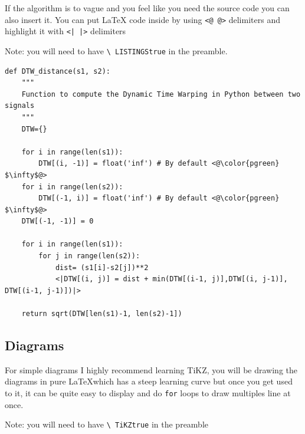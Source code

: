 \documentclass[11pt,letterpaper]{article}
\begin{document}
\begin{tip}
If the algorithm is to vague and you feel like you need the source code you can also insert it. You can put LaTeX code inside by using \texttt{<@ @>} delimiters and highlight it with \texttt{<| |>} delimiters

Note: you will need to have \texttt{\textbackslash
LISTINGStrue} in the preamble.
\end{tip}

\begin{lstlisting}[style=Python]
def DTW_distance(s1, s2):
    """
    Function to compute the Dynamic Time Warping in Python between two signals
    """
    DTW={}

    for i in range(len(s1)):
        DTW[(i, -1)] = float('inf') # By default <@\color{pgreen} $\infty$@>
    for i in range(len(s2)):
        DTW[(-1, i)] = float('inf') # By default <@\color{pgreen} $\infty$@>
    DTW[(-1, -1)] = 0

    for i in range(len(s1)):
        for j in range(len(s2)):
            dist= (s1[i]-s2[j])**2
            <|DTW[(i, j)] = dist + min(DTW[(i-1, j)],DTW[(i, j-1)], DTW[(i-1, j-1)])|>

    return sqrt(DTW[len(s1)-1, len(s2)-1])
\end{lstlisting}

\clearpage
\subsection{Diagrams} %
\label{sub:diagrams}

\begin{tip}
For simple diagrams I highly recommend learning TiKZ, you will be drawing the diagrams in pure \LaTeX which has a steep learning curve but once you get used to it, it can be quite easy to display and do \texttt{for} loops to draw multiples line at once.

Note: you will need to have \texttt{\textbackslash
TiKZtrue} in the preamble
\end{tip}
\end{document}
